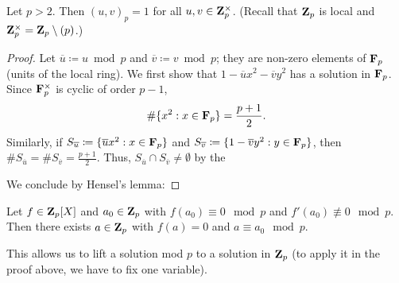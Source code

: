 \documentclass{article}
\begin{document}
\begin{lem}\label{lem:units}
	Let $p>2$. Then $(u,v)_p=1$ for all $u,v\in\mathbf{Z}_p^\times$.
	(Recall that $\mathbf{Z}_p$ is local and $\mathbf{Z}_p^\times=\mathbf{Z}_p\setminus(p)$.)
\end{lem}
\begin{proof}
	Let $\overline{u}\coloneqq u\bmod p$ and $\overline{v}\coloneqq v\bmod p$; they are non-zero elements of $\mathbf{F}_p$ (units of the local ring).
	We first show that $1-\overline{u}x^2-\overline{v}y^2$ has a solution in $\mathbf{F}_p$. Since $\mathbf{F}_p^\times$ is cyclic of order $p-1$,
	\[
		\#\{x^2 : x\in\mathbf{F}_p\} = \frac{p+1}{2}.
	\]
	Similarly, if $S_{\overline{u}}\coloneqq\{\overline{u}x^2:x\in\mathbf{F}_p\}$ and $S_{\overline{v}}\coloneqq\{1-\overline{v}y^2 : y\in\mathbf{F}_p\}$, then $\#S_{\overline{u}}=\#S_{\overline{v}}=
		\frac{p+1}{2}$.
	Thus, $S_{\overline u}\cap S_{\overline v}\neq\emptyset$ by the

	We conclude by Hensel's lemma:
\end{proof}

\begin{lem}[Hensel]
	Let $f\in\mathbf{Z}_p[X]$ and $a_0\in\mathbf{Z}_p$ with $f(a_0)\equiv 0\mod p$ and $f'(a_0)\not\equiv 0\mod p$. Then there exists $a\in\mathbf{Z}_p$ with $f(a)=0$ and $a\equiv a_0\mod p$.
\end{lem}
This allows us to lift a solution mod $p$ to a solution in $\mathbf{Z}_p$ (to apply it in the proof above, we have to fix one variable).
\end{document}
